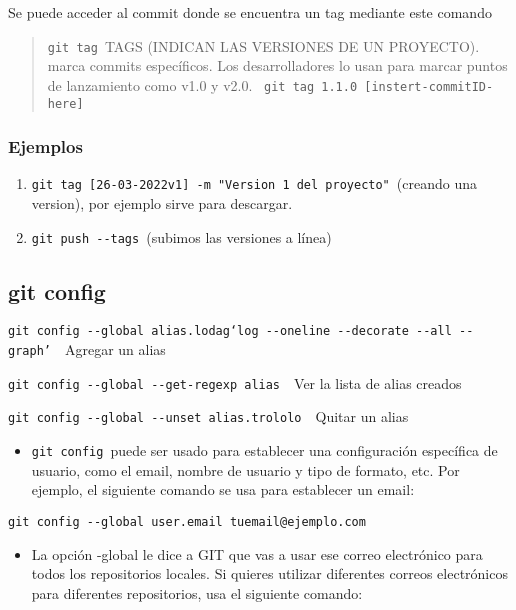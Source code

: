 \documentclass[
  a2paper,
]{article}
\providecommand{\tightlist}{%
  \setlength{\itemsep}{0pt}\setlength{\parskip}{0pt}}\usepackage{longtable,booktabs,array}
\begin{document}
Se puede acceder al commit donde se encuentra un tag mediante este
comando

\begin{quote}
\texttt{git\ tag}~TAGS (INDICAN LAS VERSIONES DE UN PROYECTO). marca
commits específicos. Los desarrolladores lo usan para marcar puntos de
lanzamiento como v1.0 y v2.0.~
\texttt{git\ tag\ 1.1.0~{[}instert-commitID-here{]}}
\end{quote}

\hypertarget{ejemplos-1}{%
\subsubsection{Ejemplos}\label{ejemplos-1}}

\begin{enumerate}
\def\labelenumi{\arabic{enumi}.}
\item
  \texttt{git\ tag~{[}26-03-2022v1{]}~-m\ "Version\ 1\ del\ proyecto"}~(creando
  una version), por ejemplo sirve para descargar.
\item
  \texttt{git\ push\ -\/-tags}~(subimos las versiones a línea)
\end{enumerate}

\hypertarget{git-config}{%
\subsection{git config}\label{git-config}}

\texttt{git\ config\ -\/-global\ alias.lodag‘log\ -\/-oneline\ -\/-decorate\ -\/-all\ -\/-graph’}~~Agregar
un alias~~

\texttt{git\ config\ -\/-global\ -\/-get-regexp\ alias}~~Ver la lista de
alias creados~~

\texttt{git\ config\ -\/-global\ -\/-unset\ alias.trololo}~~Quitar un
alias

\begin{itemize}
\tightlist
\item
  \texttt{git\ config}~puede ser usado para establecer una configuración
  específica de usuario, como el email, nombre de usuario y tipo de
  formato, etc. Por ejemplo, el siguiente comando se usa para establecer
  un email:
\end{itemize}

\texttt{git\ config\ -\/-global\ user.email~tuemail@ejemplo.com}

\begin{itemize}
\tightlist
\item
  La opción -global le dice a GIT que vas a usar ese correo electrónico
  para todos los repositorios locales. Si quieres utilizar diferentes
  correos electrónicos para diferentes repositorios, usa el siguiente
  comando:
\end{itemize}
\end{document}
